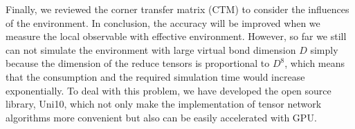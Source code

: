 Finally, we reviewed the corner transfer matrix (CTM) to consider the influences of the environment. In conclusion, the accuracy will be improved when we measure the local observable with effective environment. However, so far we still can not simulate the environment with large virtual bond dimension $D$ simply because the dimension of the reduce tensors is proportional to $D^8$, which means that the consumption and the required simulation time would increase exponentially. To deal with this problem, we have developed the open source library, Uni10, which not only make the implementation of tensor network algorithms more convenient but also can be easily accelerated with GPU.

